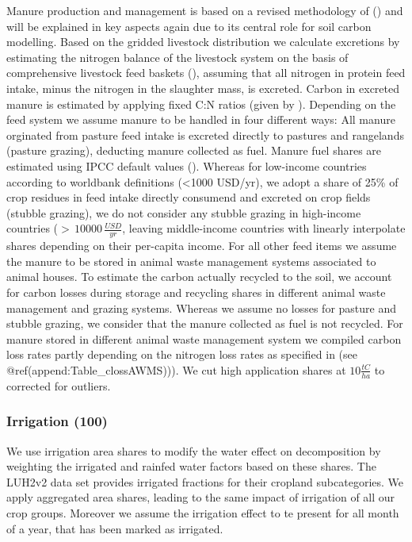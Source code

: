 \documentclass[gc, manuscript]{copernicus}
\begin{document}
Manure production and management is based on a revised methodology of
(\citep{bodirsky2012}) and will be explained in key aspects again due to
its central role for soil carbon modelling. Based on the gridded
livestock distribution we calculate excretions by estimating the
nitrogen balance of the livestock system on the basis of comprehensive
livestock feed baskets (\citep{weindl}), assuming that all nitrogen in
protein feed intake, minus the nitrogen in the slaughter mass, is
excreted. Carbon in excreted manure is estimated by applying fixed C:N
ratios (given by \citep[(][]{ipcc_2019_2019}). Depending on the feed
system we assume manure to be handled in four different ways: All manure
orginated from pasture feed intake is excreted directly to pastures and
rangelands (pasture grazing), deducting manure collected as fuel. Manure
fuel shares are estimated using IPCC default values
(\citet{ippc_2006_2006}). Whereas for low-income countries according to
worldbank definitions (\textless1000 USD/yr), we adopt a share of 25\%
of crop residues in feed intake directly consumend and excreted on crop
fields (stubble grazing), we do not consider any stubble grazing in
high-income countries (\(>\,10000\,\tfrac{USD}{yr}\), leaving
middle-income countries with linearly interpolate shares depending on
their per-capita income. For all other feed items we assume the manure
to be stored in animal waste management systems associated to animal
houses. To estimate the carbon actually recycled to the soil, we account
for carbon losses during storage and recycling shares in different
animal waste management and grazing systems. Whereas we assume no losses
for pasture and stubble grazing, we consider that the manure collected
as fuel is not recycled. For manure stored in different animal waste
management system we compiled carbon loss rates partly depending on the
nitrogen loss rates as specified in \citep{bodirsky2012} (see
@ref(append:Table\_clossAWMS))). We cut high application shares at
\(10\tfrac{\unit{tC}}{\unit{ha}}\) to corrected for outliers.

\subsubsection{Irrigation (100)}

We use irrigation area shares to modify the water effect on
decomposition by weighting the irrigated and rainfed water factors based
on these shares. The LUH2v2 data set provides irrigated fractions for
their cropland subcategories. We apply aggregated area shares, leading
to the same impact of irrigation of all our crop groups. Moreover we
assume the irrigation effect to te present for all month of a year, that
has been marked as irrigated.
\end{document}
